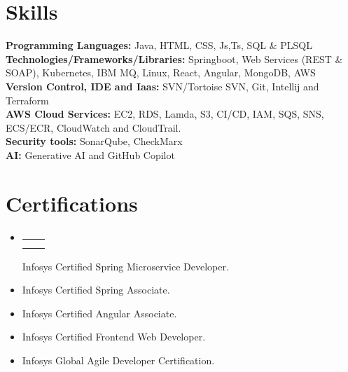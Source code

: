 \documentclass[letterpaper,10pt]{article}
\makeatletter
\newcommand{\resumeItem}[1]{
  \item\small{
    {#1 \vspace{-3pt}}
  }
}
\newcommand{\resumeSubheading}[4]{
  \vspace{-2pt}\item
    \begin{tabular*}{0.97\textwidth}[t]{l@{\extracolsep{\fill}}r}
      \textbf{#1} & #2 \\
      \textit{\small#3} & \textit{\small #4} \\
    \end{tabular*}\vspace{-7pt}
}
\newcommand{\resumeSubHeadingListStart}{\begin{itemize}[leftmargin=0.15in, label={}]}
\newcommand{\resumeSubHeadingListEnd}{\end{itemize}}
\newcommand{\resumeItemListStart}{\begin{itemize}}
\newcommand{\resumeItemListEnd}{\end{itemize}\vspace{-5pt}}
\makeatother
\begin{document}
\section{Skills}
  \vspace{3pt}
  \resumeSubHeadingListStart
    \small{\item{
        
        \textbf{Programming Languages:}{ Java, HTML, CSS, Js,Ts, SQL \& PLSQL} \\ \vspace{3pt}
        \textbf{Technologies/Frameworks/Libraries:}{ Springboot, Web Services (REST \& SOAP), Kubernetes, IBM MQ, Linux, React, Angular, MongoDB, AWS } \\ \vspace{3pt}
        \textbf{Version Control, IDE and Iaas:}{ SVN/Tortoise SVN,  Git, Intellij and Terraform } \\ \vspace{3pt}
        \textbf{AWS Cloud Services:}{ EC2, RDS, Lamda, S3, CI/CD, IAM, SQS, SNS, ECS/ECR, CloudWatch and CloudTrail. } \\ \vspace{3pt}
        \textbf{Security tools:}{ SonarQube, CheckMarx} \\ \vspace{3pt}
        \textbf{AI:}{ Generative AI and GitHub Copilot} \\ \vspace{3pt}
    }}
  \resumeSubHeadingListEnd

\section{Certifications}
  \vspace{3pt}
  \resumeSubHeadingListStart         
    \resumeSubheading
               \resumeItemListStart
                   \resumeItem{Infosys Certified Java SE8 Developer.}
                   \resumeItem{Infosys Certified Spring Microservice Developer.}
                   \resumeItem{Infosys Certified Spring Associate.}
                   \resumeItem{Infosys Certified Angular Associate.}
                   \resumeItem{Infosys Certified Frontend Web Developer.}
                   \resumeItem{Infosys Global Agile Developer Certification.}
               \resumeItemListEnd
\end{document}
